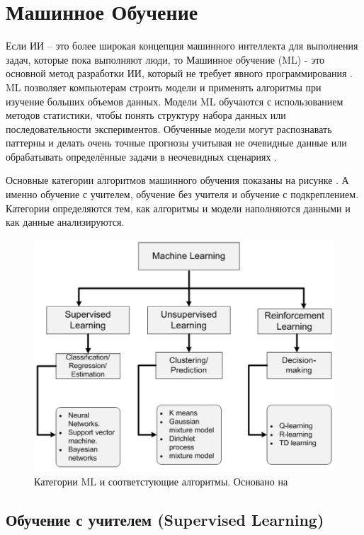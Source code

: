 \section{Машинное Обучение} \label{ch1:ml}

Если ИИ – это более широкая концепция машинного интеллекта для выполнения задач, которые пока выполняют люди, то Машинное обучение (ML) - это основной метод разработки ИИ, который не требует явного программирования \cite{Samuel-SomeStudies}. ML позволяет компьютерам строить модели и применять алгоритмы при изучение больших объемов данных. Модели ML обучаются с использованием методов статистики, чтобы понять структуру набора данных или последовательности экспериментов. Обученные модели могут распознавать паттерны и делать очень точные прогнозы учитывая не очевидные данные или обрабатывать определённые задачи в неочевидных сценариях \cite{bishop06pattern}.

Основные категории алгоритмов машинного обучения показаны на рисунке . А именно обучение с учителем, обучение без учителя и обучение с подкреплением.
Категории определяются тем, как алгоритмы и модели наполняются данными и как данные анализируются.

\begin{figure}[ht!] 
	\center
	\includegraphics [scale=0.60] {my_folder/images/ch1/ML-categories.png}
	\caption{Категории ML и соответстующие алгоритмы. Основано на \cite{Sultan_2018}} 
	\label{fig:ch1-ML-categories}
\end{figure}


\subsection{Обучение с учителем (Supervised Learning)}

